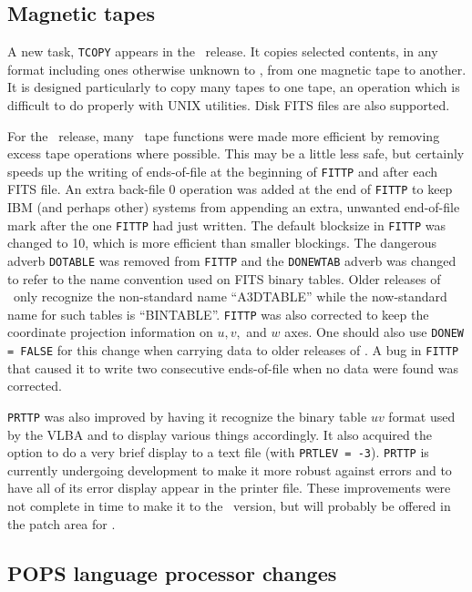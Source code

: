 \subsection{Magnetic tapes}

A new task, {\tt TCOPY} appears in the \RELEASENAME\ release.  It
copies selected contents, in any format including ones otherwise
unknown to \AIPS, from one magnetic tape to another.  It is designed
particularly to copy many tapes to one tape, an operation which is
difficult to do properly with UNIX utilities.  Disk FITS files are
also supported.

For the \RELEASENAME\ release, many \AIPS\ tape functions were made
more efficient by removing excess tape operations where possible.
This may be a little less safe, but certainly speeds up the writing of
ends-of-file at the beginning of {\tt FITTP} and after each FITS file.
An extra back-file 0 operation was added at the end of {\tt FITTP} to
keep IBM (and perhaps other) systems from appending an extra, unwanted
end-of-file mark after the one {\tt FITTP} had just written.  The
default blocksize in {\tt FITTP} was changed to 10, which is more
efficient than smaller blockings.  The dangerous adverb {\tt DOTABLE}
was removed from {\tt FITTP} and the {\tt DONEWTAB} adverb was changed
to refer to the name convention used on FITS binary tables.  Older
releases of \AIPS\ only recognize the non-standard name ``A3DTABLE''
while the now-standard name for such tables is \hbox{``BINTABLE''}.
{\tt FITTP} was also corrected to keep the coordinate projection
information on $u, v, $ and $w$ axes.  One should also use {\tt DONEW
= FALSE} for this change when carrying data to older releases of
\AIPS.  A bug in {\tt FITTP} that caused it to write two consecutive
ends-of-file when no data were found was corrected.

{\tt PRTTP} was also improved by having it recognize the binary table
$uv$ format used by the VLBA and to display various things
accordingly.  It also acquired the option to do a very brief display
to a text file (with {\tt PRTLEV = -3}).  {\tt PRTTP} is currently
undergoing development to make it more robust against errors and to
have all of its error display appear in the printer file.  These
improvements were not complete in time to make it to the \RELEASENAME\
version, but will probably be offered in the patch area for
\hbox{\RELEASENAME}.

\subsection{POPS language processor changes}


